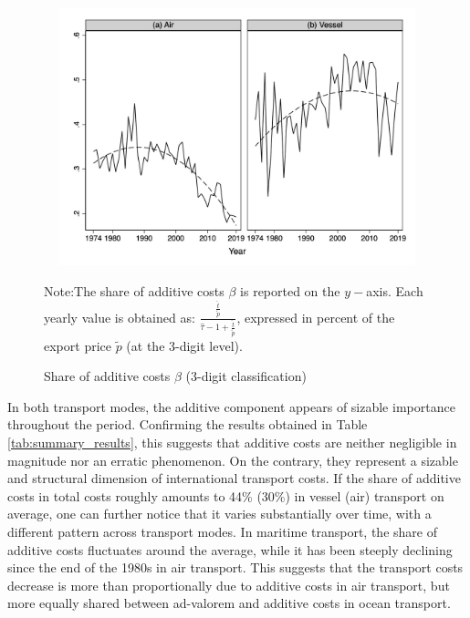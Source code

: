 \documentclass[a4paper,11pt]{article}
\begin{document}
\begin{figure}[htbp]
\caption{Share of additive costs $\beta$ (3-digit classification)}
\label{fig:part_cout_additif}
\begin{center}
 \includegraphics[width=12cm, height=7.5cm]{Figure1_share_of_additive_in_totalTC.jpg}
\begin{minipage} [c]  {5in} \scriptsize%
Note:The share of additive costs $\beta$ is reported on the $y-$axis. Each yearly value is obtained as: $\frac{\frac{\widehat{t}}{\widetilde{p}}}{\widehat{\tau}-1+\frac{\widehat{t}}{\widetilde{p}}}$, expressed in percent of the export price $\widetilde{p}$ (at the 3-digit level).
\end{minipage}
\end{center}
\end{figure}


%


In both transport modes, the additive component appears of sizable importance throughout the period.
Confirming the results obtained in Table \ref{tab:summary_results}, this suggests that additive costs are neither negligible in magnitude nor an erratic phenomenon.
On the contrary, they represent a sizable and structural dimension of international transport costs.
If the share of additive costs in total costs roughly amounts to 44\% (30\%) in vessel (air) transport on average, one can further notice that it varies substantially over time, with a different pattern across transport modes. In maritime transport, the share of additive costs fluctuates around the average, while it has been steeply declining since the end of the 1980s in air transport. This suggests that the transport costs decrease is more than proportionally due to additive costs in air transport, but more equally shared between ad-valorem and additive costs in ocean transport.\smallskip
\end{document}
